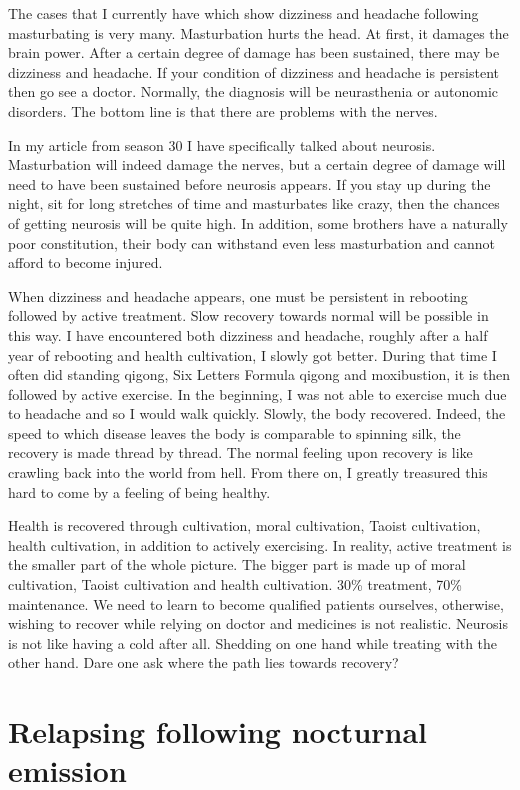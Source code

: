 \documentclass[
]{book}
\begin{document}
The cases that I currently have which show dizziness and headache following masturbating is very many. Masturbation hurts the head. At first, it damages the brain power. After a certain degree of damage has been sustained, there may be dizziness and headache. If your condition of dizziness and headache is persistent then go see a doctor. Normally, the diagnosis will be neurasthenia or autonomic disorders. The bottom line is that there are problems with the nerves.

In my article from season 30 I have specifically talked about neurosis. Masturbation will indeed damage the nerves, but a certain degree of damage will need to have been sustained before neurosis appears. If you stay up during the night, sit for long stretches of time and masturbates like crazy, then the chances of getting neurosis will be quite high. In addition, some brothers have a naturally poor constitution, their body can withstand even less masturbation and cannot afford to become injured.

When dizziness and headache appears, one must be persistent in rebooting followed by active treatment. Slow recovery towards normal will be possible in this way. I have encountered both dizziness and headache, roughly after a half year of rebooting and health cultivation, I slowly got better. During that time I often did standing qigong, Six Letters Formula qigong and moxibustion, it is then followed by active exercise. In the beginning, I was not able to exercise much due to headache and so I would walk quickly. Slowly, the body recovered. Indeed, the speed to which disease leaves the body is comparable to spinning silk, the recovery is made thread by thread. The normal feeling upon recovery is like crawling back into the world from hell. From there on, I greatly treasured this hard to come by a feeling of being healthy.

Health is recovered through cultivation, moral cultivation, Taoist cultivation, health cultivation, in addition to actively exercising. In reality, active treatment is the smaller part of the whole picture. The bigger part is made up of moral cultivation, Taoist cultivation and health cultivation. 30\% treatment, 70\% maintenance. We need to learn to become qualified patients ourselves, otherwise, wishing to recover while relying on doctor and medicines is not realistic. Neurosis is not like having a cold after all. Shedding on one hand while treating with the other hand. Dare one ask where the path lies towards recovery?

\hypertarget{relapsing-following-nocturnal-emission}{%
\section{Relapsing following nocturnal emission}\label{relapsing-following-nocturnal-emission}}
\end{document}
